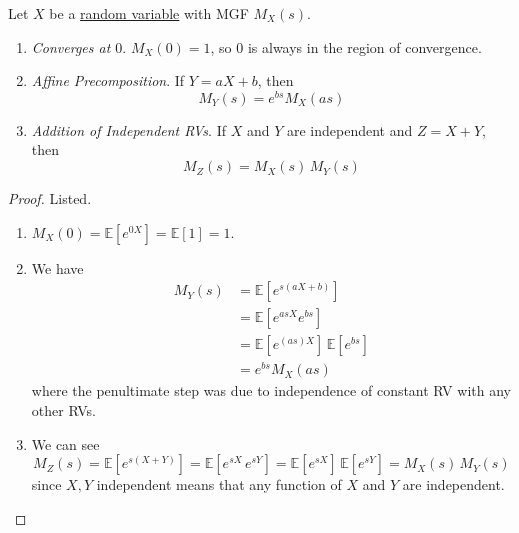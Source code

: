 	\begin{lemma}
	  \label{thm:properties-of-mgf}
		Let $X$ be a \hyperref[def:random-variable]{random variable} with MGF $M_X (s)$. 
		\begin{enumerate}
			\item \textit{Converges at $0$}. $M_X (0) = 1$, so $0$ is always in the region of convergence. 

			\item \textit{Affine Precomposition}. If $Y = a X + b$, then 
				\begin{equation}
					M_Y (s) = e^{b s} M_X (a s)
				\end{equation}

			\item \textit{Addition of Independent RVs}. If $X$ and $Y$ are independent and $Z = X + Y$, then 
				\begin{equation}
					M_Z (s) = M_X (s) \, M_Y (s)
				\end{equation}
		\end{enumerate}
	\end{lemma}
	\begin{proof}
		Listed. 
		\begin{enumerate}
			\item $M_X (0) = \mathbb{E}[e^{0 X}] = \mathbb{E}[1] = 1$. 
			\item We have 
			\begin{align*}
				M_Y (s) & = \mathbb{E} [e^{s(a X + b)}] \\
				& = \mathbb{E}[ e^{a s X } e^{b s}] \\
				& = \mathbb{E}[e^{(as) X}] \, \mathbb{E}[e^{b s}] \\
				& = e^{b s} M_X (a s)
			\end{align*}
			where the penultimate step was due to independence of constant RV with any other RVs. 
			\item We can see 
			\begin{equation}
				M_Z (s) = \mathbb{E}[ e^{s (X + Y)}] = \mathbb{E}[e^{s X} \, e^{s Y}] = \mathbb{E}[e^{s X}] \, \mathbb{E}[e^{s Y}] = M_X (s) \, M_Y (s)
			\end{equation}
			since $X, Y$ independent means that any function of $X$ and $Y$ are independent. 
		\end{enumerate}
	\end{proof}

